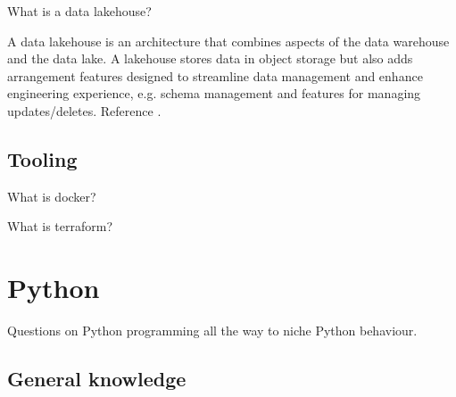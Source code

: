 \begin{questions}
\question What is a data lakehouse?
\begin{solution}
A data lakehouse is an architecture that combines aspects of the data warehouse and the data lake. A lakehouse stores data in object storage but also adds arrangement features designed to streamline data management and enhance engineering experience, e.g. schema management and features for managing updates/deletes.
Reference \cite[p.~220]{fode}.
\end{solution}
\end{questions}

\subsection{Tooling}

\begin{questions}
\question[1] What is docker?
\begin{solution}

\end{solution}

\question[1] What is terraform?
\begin{solution}

\end{solution}
\end{questions}

\section{Python}

Questions on Python programming all the way to niche Python behaviour.

\subsection{General knowledge}

